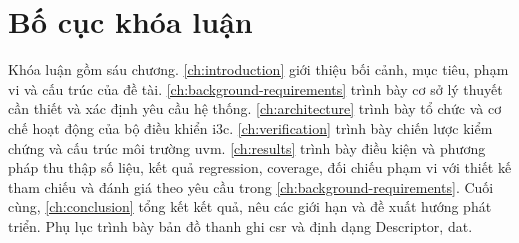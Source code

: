 \section{Bố cục khóa luận}
\label{sec:intro-outline}

Khóa luận gồm sáu chương. \cref{ch:introduction} giới thiệu bối cảnh, mục tiêu, phạm vi và cấu trúc của đề tài. \cref{ch:background-requirements} trình bày cơ sở lý thuyết cần thiết và xác định yêu cầu hệ thống. \cref{ch:architecture} trình bày tổ chức và cơ chế hoạt động của bộ điều khiển \gls{i3c}. \cref{ch:verification} trình bày chiến lược kiểm chứng và cấu trúc môi trường \gls{uvm}. \cref{ch:results} trình bày điều kiện và phương pháp thu thập số liệu, kết quả regression, coverage, đối chiếu phạm vi với thiết kế tham chiếu và đánh giá theo yêu cầu trong \cref{ch:background-requirements}. Cuối cùng, \cref{ch:conclusion} tổng kết kết quả, nêu các giới hạn và đề xuất hướng phát triển. Phụ lục trình bày bản đồ thanh ghi \gls{csr} và định dạng Descriptor, \gls{dat}.
